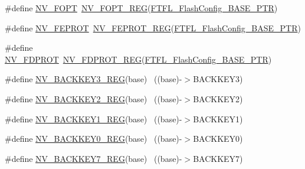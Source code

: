 \begin{DoxyCompactItemize}
\item 
\#define \hyperlink{group___n_v___register___accessor___macros_gad508c386413905d31c12a2319fa355e3}{N\+V\+\_\+\+F\+O\+PT}~\hyperlink{group___n_v___register___accessor___macros_ga66cb061090c7bd7c8b2447b133a93ce5}{N\+V\+\_\+\+F\+O\+P\+T\+\_\+\+R\+EG}(\hyperlink{group___n_v___peripheral_gad199a235b90fe3e6afb977f2d6a9c565}{F\+T\+F\+L\+\_\+\+Flash\+Config\+\_\+\+B\+A\+S\+E\+\_\+\+P\+TR})
\item 
\#define \hyperlink{group___n_v___register___accessor___macros_ga042021b7c9ba543352055825ab37f11b}{N\+V\+\_\+\+F\+E\+P\+R\+OT}~\hyperlink{group___n_v___register___accessor___macros_ga689f6db632fecfda17b3a0af63529b29}{N\+V\+\_\+\+F\+E\+P\+R\+O\+T\+\_\+\+R\+EG}(\hyperlink{group___n_v___peripheral_gad199a235b90fe3e6afb977f2d6a9c565}{F\+T\+F\+L\+\_\+\+Flash\+Config\+\_\+\+B\+A\+S\+E\+\_\+\+P\+TR})
\item 
\#define \hyperlink{group___n_v___register___accessor___macros_gaa36202cc8cc9caa02eee166ffce5efc6}{N\+V\+\_\+\+F\+D\+P\+R\+OT}~\hyperlink{group___n_v___register___accessor___macros_ga8c387944c38c4df1397982458df8a2f1}{N\+V\+\_\+\+F\+D\+P\+R\+O\+T\+\_\+\+R\+EG}(\hyperlink{group___n_v___peripheral_gad199a235b90fe3e6afb977f2d6a9c565}{F\+T\+F\+L\+\_\+\+Flash\+Config\+\_\+\+B\+A\+S\+E\+\_\+\+P\+TR})
\item 
\#define \hyperlink{group___n_v___register___accessor___macros_ga3f3d8bddafcafafb27fb8981656492e1}{N\+V\+\_\+\+B\+A\+C\+K\+K\+E\+Y3\+\_\+\+R\+EG}(base)                                    ~((base)-\/$>$B\+A\+C\+K\+K\+E\+Y3)
\item 
\#define \hyperlink{group___n_v___register___accessor___macros_gaad90d55fc5c046a8e8508b04cbe2fbbb}{N\+V\+\_\+\+B\+A\+C\+K\+K\+E\+Y2\+\_\+\+R\+EG}(base)                                    ~((base)-\/$>$B\+A\+C\+K\+K\+E\+Y2)
\item 
\#define \hyperlink{group___n_v___register___accessor___macros_gaa618f324e87cf548f4736270e46fcc57}{N\+V\+\_\+\+B\+A\+C\+K\+K\+E\+Y1\+\_\+\+R\+EG}(base)                                    ~((base)-\/$>$B\+A\+C\+K\+K\+E\+Y1)
\item 
\#define \hyperlink{group___n_v___register___accessor___macros_ga905f2d4f792d634634d339e5b6170fe1}{N\+V\+\_\+\+B\+A\+C\+K\+K\+E\+Y0\+\_\+\+R\+EG}(base)                                    ~((base)-\/$>$B\+A\+C\+K\+K\+E\+Y0)
\item 
\#define \hyperlink{group___n_v___register___accessor___macros_ga7f6090f0eb664b59d0e6e79b492fe8e4}{N\+V\+\_\+\+B\+A\+C\+K\+K\+E\+Y7\+\_\+\+R\+EG}(base)                                    ~((base)-\/$>$B\+A\+C\+K\+K\+E\+Y7)

\end{DoxyCompactItemize}
